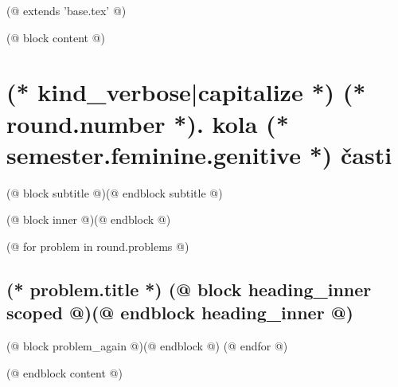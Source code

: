 (@ extends 'base.tex' @)

(@ block content @)
    \thispagestyle{seminar-booklet-first}

    \afterpage{\globaldefs=1\restoregeometry}

    \pagestyle{seminar-booklet-body}


    \section{%
        \texorpdfstring{%
            (* kind_verbose|capitalize *) (* round.number *). kola (* semester.feminine.genitive *) časti%
        }{%
            (* kind_verbose|capitalize *)%
        }%
    }
    (@ block subtitle @)(@ endblock subtitle @)

    \setcounter{volume}{(* volume.number *)}
    \setcounter{semester}{(* semester.number *)}
    \setcounter{round}{(* round.number *)}
    \setcounter{section}{(* round.number *)}
    (@ block inner @)(@ endblock @)

    (@ for problem in round.problems @)%
        \setcounter{problem}{(* problem.number *)}%
        \hypertarget{(* volume.id *)(* semester.id *)(* round.id *)(* problem.id *)-(* kind *)}{
            \subsection{%
                \texorpdfstring{%
                    \large \textbf{(* problem.title *)} \hfill \normalsize%
                    (@ block heading_inner scoped @)(@ endblock heading_inner @)%
                }{%
                    (* round.number *).(* problem.number *) (* problem.title *)%
                }%
            }%
            \label{sec:(* volume.id *)(* semester.id *)(* round.id *)(* problem.id *)-(* kind *)}
        }%
        (@ block problem_again @)(@ endblock @)
    (@ endfor @)

(@ endblock content @)
